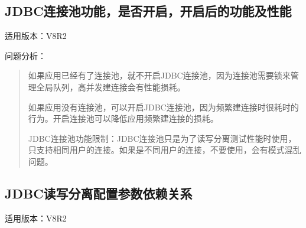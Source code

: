 \documentclass[a4,10pt,oneside,english]{sphinxmanual}
\begin{document}
\subsection{JDBC连接池功能，是否开启，开启后的功能及性能}
\label{\detokenize{interface/jdbc:id6}}
适用版本：V8R2

问题分析：
\begin{quote}

如果应用已经有了连接池，就不开启JDBC连接池，因为连接池需要锁来管理全局队列，高并发建连接会有性能损耗。

如果应用没有连接池，可以开启JDBC连接池，因为频繁建连接时很耗时的行为。开启连接池可以降低应用频繁建连接的损耗。

JDBC连接池功能限制：JDBC连接池只是为了读写分离测试性能时使用，只支持相同用户的连接。如果是不同用户的连接，不要使用，会有模式混乱问题。
\end{quote}


\subsection{JDBC读写分离配置参数依赖关系}
\label{\detokenize{interface/jdbc:id7}}
适用版本：V8R2
\end{document}
